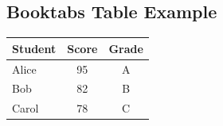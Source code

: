 \documentclass[12pt, a4paper]{article}
\begin{document}
\begin{english}

\section*{Booktabs Table Example}

\begin{tabular}{lcc}
  \toprule
  Student & Score & Grade \\
  \midrule
  Alice   & 95    & A     \\
  Bob     & 82    & B     \\
  Carol   & 78    & C     \\
  \bottomrule
\end{tabular}

\end{english}
\end{document}
